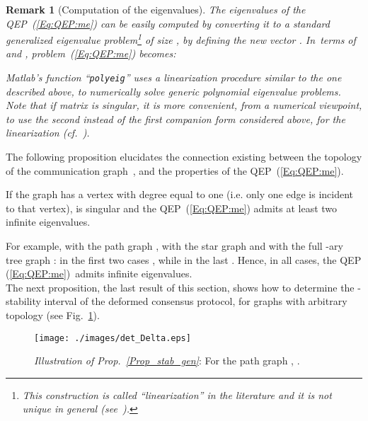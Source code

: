 \documentclass[letterpaper,9pt,twocolumn]{autart}
\newtheorem{remark}{\textbf{Remark}}
\begin{document}
\begin{remark}[Computation of the eigenvalues] The eigenvalues of the QEP~(\ref{Eq:QEP:me}) can be easily computed by converting
it to a standard \emph{generalized eigenvalue problem}\footnote{This construction is called ``linearization''
in the literature and it is not unique in general (see~\cite[Sect.~4.5]{Demmel_book97}).} of size , by defining the new
vector . In~terms of  and
, problem~(\ref{Eq:QEP:me}) becomes:

Matlab's function ``\texttt{polyeig}'' uses a linearization procedure
similar to the one described above, to numerically solve 
generic polynomial eigenvalue problems. Note that if matrix  is singular, it is more convenient, from a numerical
viewpoint, to use the second instead of the first companion form
considered above, for the linearization (cf.~\cite[Sect.~3.4]{TisseurMe_SIAM01}).~\hfill
\end{remark}
The following proposition elucidates the connection existing \mbox{between} the topology of the
communication graph~, and the properties of the QEP~(\ref{Eq:QEP:me}).
\begin{proposition}
If the graph  has a vertex with degree equal to one (i.e. only one edge
is incident to that vertex),  is singular and the QEP~(\ref{Eq:QEP:me}) admits at least two infinite eigenvalues.~\hfill
\end{proposition}
For example, with the path graph ,
with the star graph  and with the full
-ary tree graph :
in the first two cases ,
while in the last .
Hence, in all cases, the QEP (\ref{Eq:QEP:me})~admits  infinite eigenvalues.\\
The next proposition, the last result of this section, shows how to determine the \mbox{-stability} interval of
the deformed consensus protocol, for graphs with arbitrary
\mbox{topology} (see Fig.~\ref{Fig_det_Delta}).
\begin{figure}[t!]
       \begin{center}
       \texttt{[image: ./images/det\_Delta.eps]}
       \vspace{-0.15cm} 
       \caption{\emph{Illustration of Prop.~\ref{Prop_stab_gen}}: For the path graph , .}\label{Fig_det_Delta}
       \end{center}
\end{figure}
\end{document}
